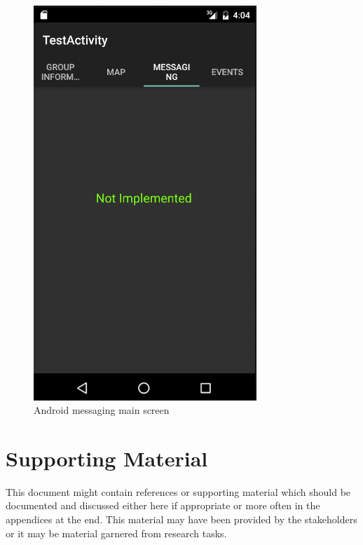 	\begin{figure}[tbh]
	\begin{center}
	\includegraphics[width=0.75\textwidth]{AndroidPictures/messagingNotImplemented.png}
	\end{center}
	\caption{Android messaging main screen \label{AndroidMessagingMain}}
	\end{figure}


\section{Supporting Material}


This document might contain references or supporting material which should be documented 
and discussed  either here if appropriate or more often in the appendices at the end.  This material may have been provided by the stakeholders  
or it may be material garnered from research tasks.

